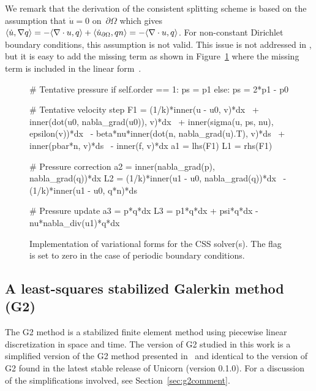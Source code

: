 We remark that the derivation of the consistent splitting scheme is
based on the assumption that $\dot{u} = 0$ on~$\partial\Omega$ which
gives $\renni{\nabla q}{\dot{u}} = -\renni{q}{\nabla \cdot u} +
\renni{qn}{\dot{u}_{\partial \Omega}} = -\renni{q}{\nabla \cdot
  u}$. For non-constant Dirichlet boundary conditions, this assumption
is not valid. This issue is not addressed in \citet{GuermondShen2003}, but it is
easy to add the missing term as shown in Figure~\ref{fig:impl_css}
where the missing term is included in the linear form~.

\begin{figure}
\bwfig
    \begin{python}
# Tentative pressure
if self.order == 1:
    ps = p1
else:
    ps = 2*p1 - p0

# Tentative velocity step
F1 = (1/k)*inner(u - u0, v)*dx \
   + inner(dot(u0, nabla_grad(u0)), v)*dx \
   + inner(sigma(u, ps, nu), epsilon(v))*dx \
   - beta*nu*inner(dot(n, nabla_grad(u).T), v)*ds \
   + inner(pbar*n, v)*ds \
   - inner(f, v)*dx
a1 = lhs(F1)
L1 = rhs(F1)

# Pressure correction
a2 = inner(nabla_grad(p), nabla_grad(q))*dx
L2 = (1/k)*inner(u1 - u0, nabla_grad(q))*dx \
   - (1/k)*inner(u1 - u0, q*n)*ds

# Pressure update
a3 = p*q*dx
L3 = p1*q*dx + psi*q*dx - nu*nabla_div(u1)*q*dx
    \end{python}
    \caption{Implementation of variational forms for the CSS
      solver(s). The flag  is set to zero in the case of
      periodic boundary conditions.}
    \label{fig:impl_css}
\end{figure}

\subsection{A least-squares stabilized Galerkin method (G2)}
\label{sec:g2}
\index{G2}

The G2 method is a stabilized finite element method using piecewise
linear discretization in space and time. The version of G2 studied in
this work is a simplified version of the G2 method presented
in~\citet{HoffmanJohnson2007} and identical to the version of G2 found
in the latest stable release of Unicorn (version 0.1.0). For a
discussion of the simplifications involved, see
Section~\ref{sec:g2comment}.

